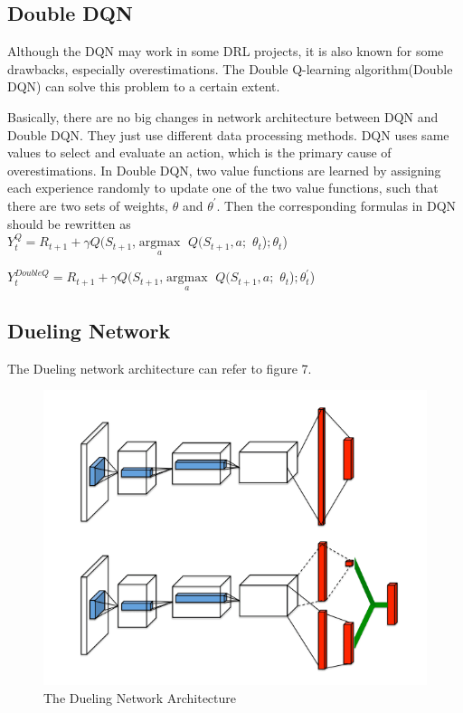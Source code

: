\documentclass[10pt,twocolumn,letterpaper]{article}
\begin{document}
  \subsection{Double DQN}
  
    Although the DQN may work in some DRL projects, it is also known for some drawbacks, especially overestimations. The Double Q-learning algorithm(Double DQN) can solve this problem to a certain extent.
    
    Basically, there are no big changes in network architecture between DQN and Double DQN. They just use different data processing methods.
    DQN uses same values to select and evaluate an action, which is the primary cause of overestimations. In Double DQN, two value functions are learned by assigning each experience randomly to update one of the two value functions, such that there are two sets of weights, $\theta$ and $\theta^{'}$. Then the corresponding formulas in DQN should be rewritten as\\
    
    $Y^{Q}_{t}=R_{t+1}+\gamma$$Q($$S_{t+1}$,$\mathop{argmax}\limits_{a}$ $Q(S_{t+1},a;$ $\theta_{t}$)$; $$\theta_{t}$)
    
    $Y^{DoubleQ}_{t}=R_{t+1}+\gamma$$Q($$S_{t+1}$,$\mathop{argmax}\limits_{a}$ $Q(S_{t+1},a;$ $\theta_{t}$)$; $$\theta_{t}^{'}$)
    
    \subsection{Dueling Network}
    
    The Dueling network architecture can refer to figure 7.
    
	\begin{figure}[!htb]
    	\centering
    	\includegraphics[width = \linewidth]{images/Dueling1}
    	\caption{The Dueling Network Architecture}
    	\label{fig::Dueling1}
   \end{figure}
    
\end{document}
